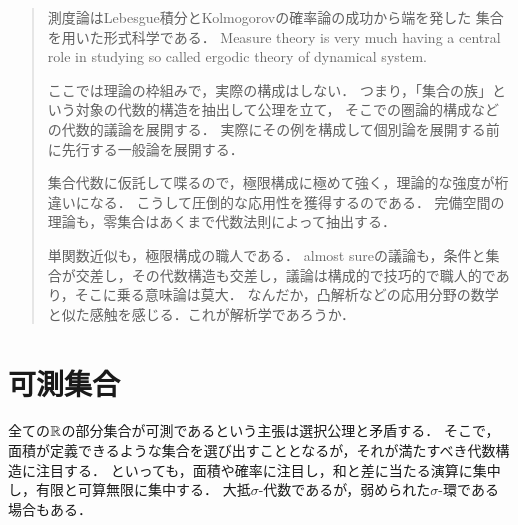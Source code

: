 \documentclass[uplatex, dvipdfmx]{jsreport}
\begin{document}
\begin{quotation}
    測度論はLebesgue積分とKolmogorovの確率論の成功から端を発した
    集合を用いた形式科学である．
    Measure theory is very much having a central role in studying so called ergodic theory of dynamical system.

    ここでは理論の枠組みで，実際の構成はしない．
    つまり，「集合の族」という対象の代数的構造を抽出して公理を立て，
    そこでの圏論的構成などの代数的議論を展開する．
    実際にその例を構成して個別論を展開する前に先行する一般論を展開する．

    集合代数に仮託して喋るので，極限構成に極めて強く，理論的な強度が桁違いになる．
    こうして圧倒的な応用性を獲得するのである．
    完備空間の理論も，零集合はあくまで代数法則によって抽出する．

    単関数近似も，極限構成の職人である．
    almost sureの議論も，条件と集合が交差し，その代数構造も交差し，議論は構成的で技巧的で職人的であり，そこに乗る意味論は莫大．
    なんだか，凸解析などの応用分野の数学と似た感触を感じる．これが解析学であろうか．
\end{quotation}

\section{可測集合}

\begin{tcolorbox}[colframe=ForestGreen, colback=ForestGreen!10!white,breakable,colbacktitle=ForestGreen!40!white,coltitle=black,fonttitle=\bfseries\sffamily,
title=集合族の代数構造と部分代数としての可測集合：素敵な加法構造を持つように集合族を選び出す]
    全ての$\mathbb{R}$の部分集合が可測であるという主張は選択公理と矛盾する．
    そこで，面積が定義できるような集合を選び出すこととなるが，それが満たすべき代数構造に注目する．
    といっても，面積や確率に注目し，和と差に当たる演算に集中し，有限と可算無限に集中する．
    大抵$\sigma$-代数であるが，弱められた$\sigma$-環である場合もある．
\end{tcolorbox}
\end{document}
